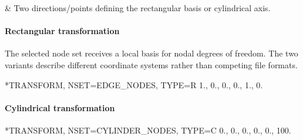 \begin{keyworddata}
 & Two directions/points defining the rectangular basis or cylindrical axis. \\
\end{keyworddata}

\paragraph*{Rectangular transformation}
The selected node set receives a local basis for nodal degrees of freedom. The two variants describe different coordinate systems rather than competing file formats.

\begin{inputdeck}
*TRANSFORM, NSET=EDGE_NODES, TYPE=R
1., 0., 0., 0., 1., 0.
\end{inputdeck}

\paragraph*{Cylindrical transformation}
\begin{inputdeck}
*TRANSFORM, NSET=CYLINDER_NODES, TYPE=C
0., 0., 0., 0., 0., 100.
\end{inputdeck}
